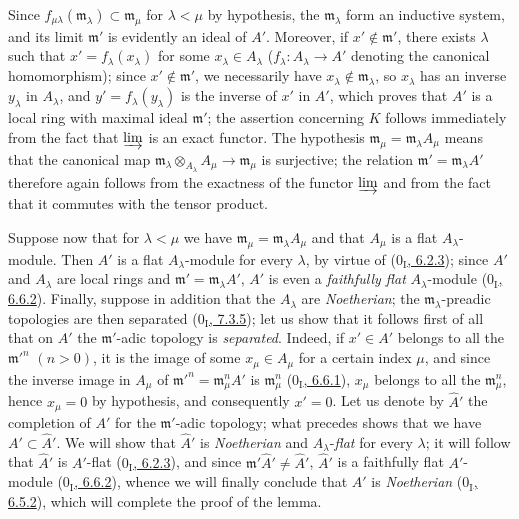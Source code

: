 Since $f_{\mu\lambda}(\mathfrak m_\lambda)\subset\mathfrak m_\mu$ for
$\lambda<\mu$ by hypothesis, the $\mathfrak m_\lambda$ form an inductive
system, and its limit $\mathfrak m'$ is evidently an ideal of $A'$.
Moreover, if $x'\notin\mathfrak m'$, there exists $\lambda$ such that
$x'=f_\lambda(x_\lambda)$ for some $x_\lambda\in A_\lambda$
($f_\lambda:A_\lambda\to A'$ denoting the canonical homomorphism); since
$x'\notin\mathfrak m'$, we necessarily have
$x_\lambda\notin\mathfrak m_\lambda$, so $x_\lambda$ has an inverse
$y_\lambda$ in $A_\lambda$, and $y'=f_\lambda(y_\lambda)$ is the inverse of
$x'$ in $A'$, which proves that $A'$ is a local ring with maximal ideal
$\mathfrak m'$; the assertion concerning $K$ follows immediately from the fact
that $\varinjlim$ is an exact functor. The hypothesis
$\mathfrak m_\mu=\mathfrak m_\lambda A_\mu$ means that the canonical
map
$\mathfrak m_\lambda\otimes_{A_\lambda}A_\mu\to\mathfrak m_\mu$ is
surjective; the relation $\mathfrak m'=\mathfrak m_\lambda A'$ therefore again
follows from the exactness of the functor $\varinjlim$ and from the fact that it
commutes with the tensor product.

Suppose now that for $\lambda<\mu$ we have
$\mathfrak m_\mu=\mathfrak m_\lambda A_\mu$ and that $A_\mu$ is a flat
$A_\lambda$-module. Then $A'$ is a flat $A_\lambda$-module for every
$\lambda$, by virtue of (\hyperref[0.6.2.3]{$0_{\mathrm I}$, 6.2.3});
since $A'$ and $A_\lambda$ are local rings and
$\mathfrak m'=\mathfrak m_\lambda A'$, $A'$ is even a
\emph{faithfully flat} $A_\lambda$-module
(\hyperref[0.6.6.2]{$0_{\mathrm I}$, 6.6.2}). Finally, suppose in addition
that the $A_\lambda$ are \emph{Noetherian}; the
$\mathfrak m_\lambda$-preadic topologies are then separated
(\hyperref[0.7.3.5]{$0_{\mathrm I}$, 7.3.5}); let us show that it follows
first of all that on $A'$ the $\mathfrak m'$-adic topology is \emph{separated}.
Indeed, if $x'\in A'$ belongs to all the $\mathfrak m'^{n}$ $(n>0)$,
it is the image of some $x_\mu\in A_\mu$ for a certain index $\mu$, and since
the inverse image in $A_\mu$ of
$\mathfrak m'^{n}=\mathfrak m_\mu^n A'$ is $\mathfrak m_\mu^n$
(\hyperref[0.6.6.1]{$0_{\mathrm I}$, 6.6.1}), $x_\mu$ belongs to all
the $\mathfrak m_\mu^n$, hence $x_\mu=0$ by hypothesis, and consequently
$x'=0$. Let us denote by $\widehat A'$ the completion of $A'$ for the
$\mathfrak m'$-adic topology; what precedes shows that we have
$A'\subset\widehat A'$. We will show that $\widehat A'$ is
\emph{Noetherian} and $A_\lambda$-\emph{flat} for every $\lambda$; it will
follow that $\widehat A'$ is $A'$-flat
(\hyperref[0.6.2.3]{$0_{\mathrm I}$, 6.2.3}), and since
$\mathfrak m'\widehat A'\ne\widehat A'$, $\widehat A'$ is a faithfully
flat $A'$-module (\hyperref[0.6.6.2]{$0_{\mathrm I}$, 6.6.2}), whence we
will finally conclude that $A'$ is \emph{Noetherian}
(\hyperref[0.6.5.2]{$0_{\mathrm I}$, 6.5.2}), which will complete the
proof of the lemma.

